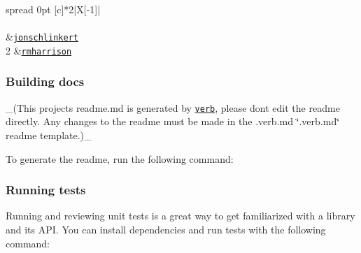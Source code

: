 {\ttfamily \tabulinesep=1mm
\begin{longtabu} spread 0pt [c]{*{2}{|X[-1]}|}
\hline
\rowcolor{\tableheadbgcolor}\\
\endfirsthead
\hline
\endfoot
\hline
\rowcolor{\tableheadbgcolor}\\
  &\href{https://github.com/jonschlinkert}{\tt jonschlinkert}   \\
2  &\href{https://github.com/rmharrison}{\tt rmharrison}   \\
\end{longtabu}
}

{\ttfamily \subsubsection*{Building docs}}

{\ttfamily }

{\ttfamily \+\_\+(This project\textquotesingle{}s readme.\+md is generated by \href{https://github.com/verbose/verb-generate-readme}{\tt verb}, please don\textquotesingle{}t edit the readme directly. Any changes to the readme must be made in the .verb.\+md \char`\"{}.\+verb.\+md\char`\"{} readme template.)\+\_\+}

{\ttfamily To generate the readme, run the following command\+:}

{\ttfamily 
{}
}

{\ttfamily \subsubsection*{Running tests}}

{\ttfamily }

{\ttfamily Running and reviewing unit tests is a great way to get familiarized with a library and its A\+PI. You can install dependencies and run tests with the following command\+:}

{\ttfamily 
{}
}

